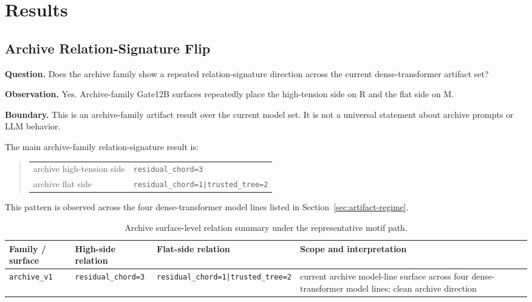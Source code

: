 \documentclass[11pt]{article}
\newcommand{\breakcode}[1]{\begingroup\urlstyle{tt}\nolinkurl{#1}\endgroup}
\newcommand{\Rsig}{\breakcode{residual_chord=3}}
\newcommand{\Msig}{\breakcode{residual_chord=1|trusted_tree=2}}
\begin{document}
\section{Results}
\label{sec:results}

\subsection{Archive Relation-Signature Flip}

\textbf{Question.} Does the archive family show a repeated relation-signature
direction across the current dense-transformer artifact set?

\textbf{Observation.} Yes. Archive-family Gate12B surfaces repeatedly place the
high-tension side on R and the flat side on M.

\textbf{Boundary.} This is an archive-family artifact result over the current
model set. It is not a universal statement about archive prompts or LLM
behavior.

The main archive-family relation-signature result is:

\begin{quote}
\begin{tabular}{ll}
archive high-tension side & \Rsig \\
archive flat side & \Msig \\
\end{tabular}
\end{quote}

This pattern is observed across the four dense-transformer model lines listed
in Section~\ref{sec:artifact-regime}.

\begin{table}[ht]
\centering
\small
\caption{Archive surface-level relation summary under the representative motif path.}
\label{tab:archive-surface-relation}
\begin{tabular}{|>{\raggedright\arraybackslash}p{}|>{\raggedright\arraybackslash}p{}|>{\raggedright\arraybackslash}p{}|>{\raggedright\arraybackslash}p{}|}
\hline
Family / surface & High-side relation & Flat-side relation & Scope and interpretation \\
\hline
\breakcode{archive_v1} & \Rsig & \Msig & current archive model-line surface across four dense-transformer model lines; clean archive direction \\
\hline
\end{tabular}
\end{table}
\end{document}
